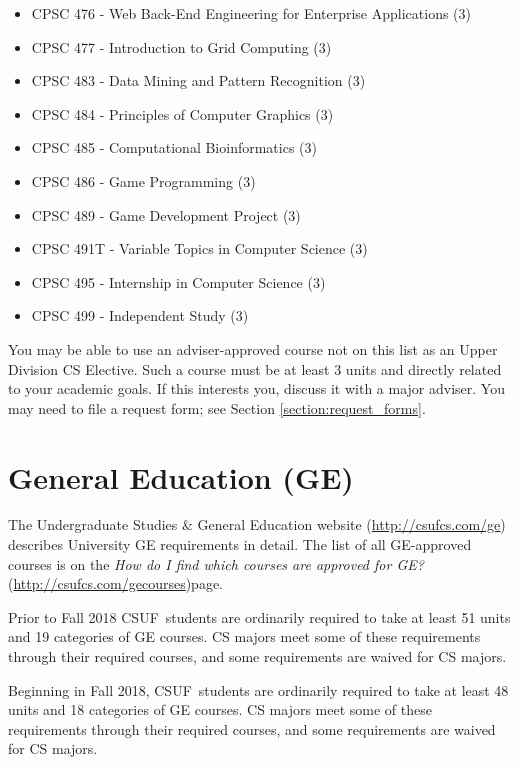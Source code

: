 \documentclass{book}
\newcommand{\CampusName}{CSUF}
\newcommand{\shrunkurl}[1]{\url{http://csufcs.com/#1}}
\begin{document}
\begin{itemize}
\item CPSC 476 - Web Back-End Engineering for Enterprise Applications (3)
\item CPSC 477 - Introduction to Grid Computing (3)
\item CPSC 483 - Data Mining and Pattern Recognition (3)
\item CPSC 484 - Principles of Computer Graphics (3)
\item CPSC 485 - Computational Bioinformatics (3)
\item CPSC 486 - Game Programming (3)
\item CPSC 489 - Game Development Project (3)
\item CPSC 491T - Variable Topics in Computer Science (3)
\item CPSC 495 - Internship in Computer Science (3)
\item CPSC 499 - Independent Study (3)
\end{itemize}

You may be able to use an adviser-approved course not on this list as
an Upper Division CS Elective. Such a course must be at least 3 units
and directly related to your academic goals. If this interests you,
discuss it with a major adviser. You may need to file a request
form; see Section \ref{section:request_forms}.

\section{General Education (GE)}

\newcommand{\gecourselist}{\emph{How do I find which courses are approved for GE?} (\shrunkurl{gecourses})}

The Undergraduate Studies \& General Education website
(\shrunkurl{ge}) describes University GE
requirements in detail. The list of all GE-approved courses is on the
\gecourselist page.

Prior to Fall 2018 \CampusName~students are ordinarily required to
take at least 51 units and 19 categories of GE courses. CS majors meet
some of these requirements through their required courses, and some
requirements are waived for CS majors.

Beginning in Fall 2018, \CampusName~students are ordinarily required
to take at least 48 units and 18 categories of GE courses. CS majors
meet some of these requirements through their required courses, and
some requirements are waived for CS majors.
\end{document}
